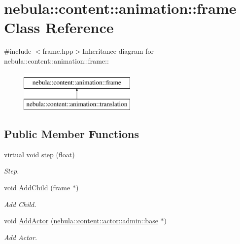 \hypertarget{classnebula_1_1content_1_1animation_1_1frame}{
\section{nebula::content::animation::frame Class Reference}
\label{classnebula_1_1content_1_1animation_1_1frame}
}


{\ttfamily \#include $<$frame.hpp$>$}Inheritance diagram for nebula::content::animation::frame::\begin{figure}[H]
\begin{center}
\leavevmode
\includegraphics[height=2cm]{classnebula_1_1content_1_1animation_1_1frame}
\end{center}
\end{figure}
\subsection*{Public Member Functions}
\begin{DoxyCompactItemize}
\item 
virtual void \hyperlink{classnebula_1_1content_1_1animation_1_1frame_a01b8c1866c9fdfdf8006e4c9341afc7a}{step} (float)
\begin{DoxyCompactList}\small\item\em Step. \item\end{DoxyCompactList}\item 
void \hyperlink{classnebula_1_1content_1_1animation_1_1frame_a96a713d46481edd00c33476da794b6f1}{AddChild} (\hyperlink{classnebula_1_1content_1_1animation_1_1frame}{frame} $\ast$)
\begin{DoxyCompactList}\small\item\em Add Child. \item\end{DoxyCompactList}\item 
void \hyperlink{classnebula_1_1content_1_1animation_1_1frame_a8ea4022bfcdd00681507f7b4a79fb9c1}{AddActor} (\hyperlink{classnebula_1_1content_1_1actor_1_1admin_1_1base}{nebula::content::actor::admin::base} $\ast$)
\begin{DoxyCompactList}\small\item\em Add Actor. \item\end{DoxyCompactList}\end{DoxyCompactItemize}
